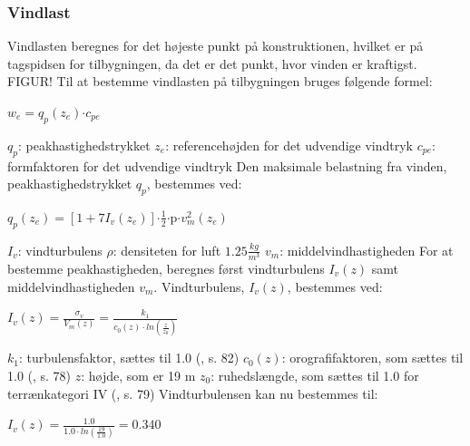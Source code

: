 \subsubsection{Vindlast}
Vindlasten beregnes for det højeste punkt på konstruktionen, hvilket er på tagspidsen for tilbygningen, da det er det punkt, hvor vinden er kraftigst.
\newline
\newline
FIGUR!
\newline
\newline
Til at bestemme vindlasten på tilbygningen bruges følgende formel:	
\begin{center} $w_e=q_p(z_e)$$\cdot$$c_{pe}$
\end{center}
$q_p$: peakhastighedstrykket
\newline
$z_e$: referencehøjden for det udvendige vindtryk
\newline
$c_{pe}$: formfaktoren for det udvendige vindtryk 
\newline
\newline
Den maksimale belastning fra vinden, peakhastighedstrykket $q_p$, bestemmes ved:
\begin{center}
$q_p(z_e)=[1+7I_v(z_e)]$$\cdot$$\frac{1}{2}$$\cdot$p$\cdot$$v_m^2(z_e)$
\end{center}
$I_v$: vindturbulens
\newline
$\rho$: densiteten for luft $1.25 \frac{kg}{m^3}$
\newline
$v_m$: middelvindhastigheden
\newline
\newline
For at bestemme peakhastigheden, beregnes først vindturbulens $I_v(z)$ samt middelvindhastigheden $v_m$.
\newline
\newline
Vindturbulens, $I_v(z)$, bestemmes ved:
\begin{center}
$I_v(z)=\frac{\sigma_v}{V_m(z)}=\frac{k_1}{c_0(z)\cdot ln(\frac{z}{z_0})}$
\end{center}
$k_1$: turbulensfaktor, sættes til 1.0 (\citep{EU91}, s. 82)
\newline
$c_0(z)$: orografifaktoren, som sættes til 1.0 (\citep{EU91}, s. 78)
\newline
$z$: højde, som er 19 m
\newline
$z_0$: ruhedslængde, som sættes til 1.0 for terrænkategori IV (\citep{EU91}, s. 79)
\newline
\newline
Vindturbulensen kan nu bestemmes til:
\begin{center}
$I_v(z)=\frac{1.0}{1.0\cdot ln(\frac{19}{1.0})}=0.340$
\end{center}
